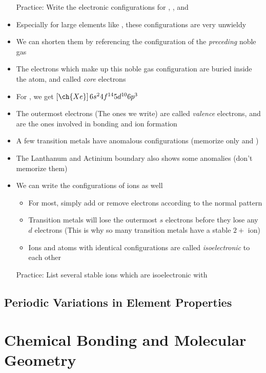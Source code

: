 \documentclass[12pt, openany, letterpaper]{memoir}
\begin{document}
\begin{itemize}
	      Practice: Write the electronic configurations for , , and 
	\item Especially for large elements like , these configurations are very unwieldy
	\item We can shorten them by referencing the configuration of the \emph{preceding} noble gas
	\item The electrons which make up this noble gas configuration are buried inside the atom, and called \emph{core} electrons
	\item For , we get $\left[\ch{Xe}\right]6s^24f^{14}5d^{10}6p^3$
	\item The outermost electrons (The ones we write) are called \emph{valence} electrons, and are the ones involved in bonding and ion formation
	\item A few transition metals have anomalous configurations (memorize only  and )
	\item The Lanthanum and Actinium boundary also shows some anomalies (don't memorize them)
	\item We can write the configurations of ions as well
	      \begin{itemize}
		      \item For most, simply add or remove electrons according to the normal pattern
		      \item Transition metals will lose the outermost $s$ electrons before they lose any $d$ electrons (This is why so many transition metals have a stable $2+$ ion)
		      \item Ions and atoms with identical configurations are called \emph{isoelectronic} to each other
	      \end{itemize}
	      Practice: List several stable ions which are isoelectronic with 
\end{itemize}

\section{Periodic Variations in Element Properties}

\chapter{Chemical Bonding and Molecular Geometry}
\end{document}
